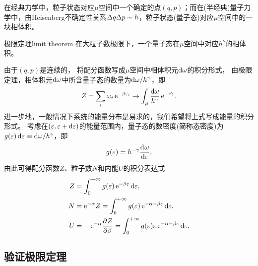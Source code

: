 \begin{remark}
	在经典力学中，粒子状态对应$\mu$空间中一个确定的点$(q,p)$；而在(半经典)量子力学中，由Heisenberg不确定性关系$\Delta q\Delta p\sim h$，粒子状态(量子态)对应$\mu$空间中的一块相体积。
\end{remark}

\begin{theorem}{极限定理}{limit theorem}
	在大粒子数极限下，一个量子态在$\mu$空间中对应$h^\gamma$的相体积。
\end{theorem}

\begin{corollary}
	由于$(q,p)$是连续的，
	将配分函数写成$\mu$空间中相体积元$\mathop{}\!\mathrm{d}\omega$的积分形式，
	由极限定理，相体积元$\mathop{}\!\mathrm{d}\omega$中所含量子态的数量为$\mathop{}\!\mathrm{d}\omega/h^\gamma$，即
	\[
		Z=\sum_i \omega_i\mathop{}\!\mathrm{e}^{-\beta\varepsilon_i}\to \int_\mu\frac{\mathrm{d}\omega}{h^\gamma}\mathop{}\!\mathrm{e}^{-\beta\varepsilon}.
	\]
	进一步地，一般情况下系统的能量分布是易求的，我们希望将上式写成能量的积分形式。
	考虑在$(\varepsilon,\varepsilon+\mathop{}\!\mathrm{d}\varepsilon)$的能量范围内，量子态的数密度(简称态密度)为
	$g(\varepsilon)\mathop{}\!\mathrm{d}\varepsilon\equiv\mathop{}\!\mathrm{d}\omega/h^\gamma$，即
	\begin{equation}
		g(\varepsilon)=h^{-\gamma}\frac{\mathrm{d}^{{}}\omega}{\mathrm{d}{\varepsilon}^{{}}},
	\end{equation}
	由此可得配分函数$Z$、粒子数$N$和内能$U$的积分表达式
	\begin{subequations}
		\begin{align}
			Z&=\int\zti g(\varepsilon)\e{-\beta\varepsilon}\d\varepsilon,\\
			N&=\e{-\alpha}Z=\int\zti g(\varepsilon)\e{-\alpha-\beta\varepsilon}\d\varepsilon,\\
			U&=-\e{-\alpha}\pv Z\beta=\int\zti g(\varepsilon)\varepsilon\e{-\alpha-\beta\varepsilon}\d\varepsilon.
		\end{align}
	\end{subequations}
\end{corollary}

\subsection*{验证极限定理}


